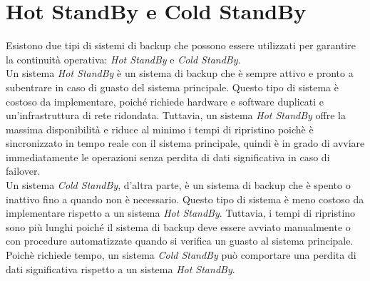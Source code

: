 \documentclass[12pt]{report}
\begin{document}
	\section{Hot StandBy e Cold StandBy}
	Esistono due tipi di sistemi di backup che possono essere utilizzati per garantire la continuità operativa: \textit{Hot StandBy} e \textit{Cold StandBy}.
	\vspace{\baselineskip}\\
	Un sistema \textit{Hot StandBy} è un sistema di backup che è sempre attivo e pronto a subentrare in caso di guasto del sistema principale. Questo tipo di sistema è costoso da implementare, poiché richiede hardware e software duplicati e un'infrastruttura di rete ridondata. Tuttavia, un sistema \textit{Hot StandBy} offre la massima disponibilità e riduce al minimo i tempi di ripristino poichè è sincronizzato in tempo reale con il sistema principale, quindi è in grado di avviare immediatamente le operazioni senza perdita di dati significativa in caso di failover.
	\vspace{\baselineskip}\\
	Un sistema \textit{Cold StandBy}, d'altra parte, è un sistema di backup che è spento o inattivo fino a quando non è necessario. Questo tipo di sistema è meno costoso da implementare rispetto a un sistema \textit{Hot StandBy}. Tuttavia, i tempi di ripristino sono più lunghi poiché il sistema di backup deve essere avviato manualmente o con procedure automatizzate quando si verifica un guasto al sistema principale. Poichè richiede tempo, un sistema \textit{Cold StandBy} può comportare una perdita di dati significativa rispetto a un sistema \textit{Hot StandBy}.
\end{document}
